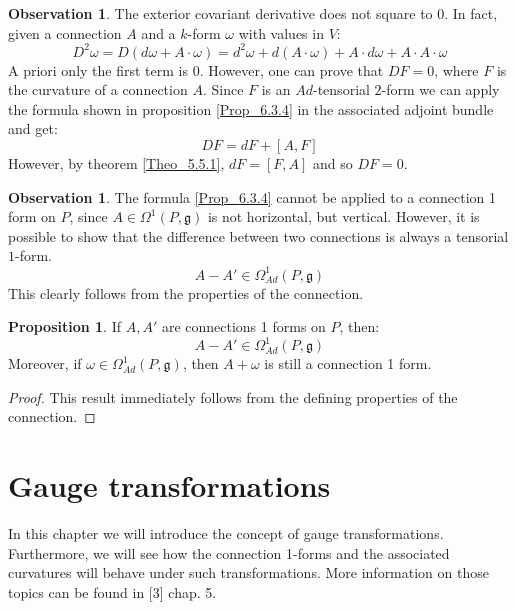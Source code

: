 \documentclass[12pt,a4paper]{report}
\theoremstyle{definition}
\theoremstyle{Theorem}
\newtheorem{Prop}[Def]{Proposition}
\theoremstyle{definition}
\theoremstyle{definition}
\newtheorem{Obs}[Def]{Observation}
\begin{document}
	\begin{Obs}\label{Obs_6.3.5}
		The exterior covariant derivative does not square to 0. In fact, given a connection $A$ and a $k$-form $\omega$ with values in $V$:
		$$D^2\omega=D(d\omega+A\cdot \omega)=d^2\omega+d(A\cdot \omega)+A\cdot d\omega+A\cdot A\cdot \omega$$
		A priori only the first term is 0. However, one can prove that $DF=0$, where $F$ is the curvature of a connection $A$. Since $F$ is an $Ad$-tensorial $2$-form we can apply the formula shown in proposition \ref{Prop_6.3.4} in the associated adjoint bundle and get:
		$$DF=dF+[A,F]$$
		However, by theorem \ref{Theo_5.5.1}, $dF=[F,A]$ and so $DF=0$.
	\end{Obs}
	\begin{Obs}
		The formula	\ref{Prop_6.3.4} cannot be applied to a connection 1 form on $P$, since $A\in\Omega^1(P,\mathfrak{g})$ is not horizontal, but vertical. However, it is possible to show that the difference between two connections is always a tensorial $1$-form. 
		$$A-A'\in\Omega^1_{Ad}(P,\mathfrak{g})$$
		This clearly follows from the properties of the connection.
	\end{Obs}
	\begin{Prop}\label{Prop_6.3.5}
		If $A,A'$ are connections 1 forms on $P$, then:
		$$A-A'\in\Omega^1_{Ad}(P,\mathfrak{g})$$
		Moreover, if $\omega\in\Omega^1_{Ad}(P,\mathfrak{g})$, then $A+\omega$ is still a connection 1 form.
	\end{Prop}
	\begin{proof}
		This result immediately follows from the defining properties of the connection.
	\end{proof}
	\chapter{Gauge transformations}
	In this chapter we will introduce the concept of gauge transformations. Furthermore, we will see how the connection 1-forms and the associated curvatures will behave under such transformations. More information on those topics can be found in [3] chap. 5.
\end{document}
